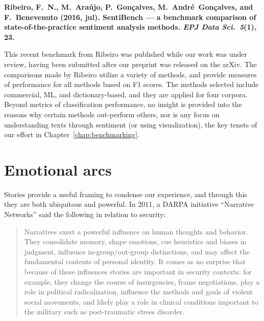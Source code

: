 {%
\noindent \textbf{Ribeiro, F.~N., M.~Ara{\'u}jo, P.~Gon{\c{c}}alves,
  M.~Andr{\'e}~Gon{\c{c}}alves, and F.~Benevenuto (2016, jul).
{SentiBench} --- a benchmark comparison of state-of-the-practice
  sentiment analysis methods.
  {\em {EPJ} Data Sci.\/}~{\em 5\/}(1), 23.}

\noindent This recent benchmark from Ribeiro \etal was published while our work was under review, having been submitted after our preprint was released on the arXiv.
The comparisons made by Ribeiro \etal utilize a variety of methods, and provide measures of performance for all methods based on F1 scores.
The methods selected include commercial, ML, and dictionary-based, and they are applied for four corpora.
Beyond metrics of classification performance, no insight is provided into the reasons why certain methods out-perform others, nor is any focus on understanding texts through sentiment (or using visualization), the key tenets of our effort in Chapter~\ref{chap:benchmarking}.\\






\clearpage
\pagebreak

\section{Emotional arcs}

Stories provide a useful framing to condense our experience, and through this they are both ubiquitous and powerful.
In 2011, a DARPA initiative ``Narrative Networks'' \citep{darpa2011narrative} said the following in relation to security:
\begin{quote}
  Narratives exert a powerful influence on human thoughts and behavior.
  They consolidate memory, shape emotions, cue heuristics and biases in judgment, influence in-group/out-group distinctions, and may affect the fundamental contents of personal identity.
  It comes as no surprise that because of these influences stories are important in security contexts: for example, they change the course of insurgencies, frame negotiations, play a role in political radicalization, influence the methods and goals of violent social movements, and likely play a role in clinical conditions important to the military such as post-traumatic stress disorder.
\end{quote}

}
